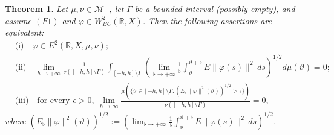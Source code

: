 \documentclass[11pt]{amsart}
\newtheorem{theorem}{Theorem}[section]
\begin{document}
\begin{theorem}\label{E2char}
Let $\mu,\nu\in\mathcal M^+$, let $\Gamma$ be a bounded interval (possibly empty), and assume $(F1)$ and $\varphi\in W^2_{BC}(\mathbb R,X)$. Then the following assertions are equivalent:
\begin{align*}
&\text{(i)}\quad \varphi\in E^2(\mathbb R,X,\mu,\nu);\\
&\text{(ii)}\quad \lim_{h\to+\infty}\frac1{\nu([-h,h]\setminus\Gamma)}\int_{[-h,h]\setminus\Gamma}\left(\lim_{\flat\to+\infty}\frac1\flat\int_\vartheta^{\vartheta+\flat}E\|\varphi(s)\|^2\,ds\right)^{1/2}d\mu(\vartheta)=0;\\
&\text{(iii)}\quad \text{for every }\epsilon>0,\ \lim_{h\to\infty}\frac{\mu(\{\vartheta\in[-h,h]\setminus\Gamma:(E_\flat\|\varphi\|^2(\vartheta))^{1/2}>\epsilon\})}{\nu([-h,h]\setminus\Gamma)}=0,
\end{align*}
where $(E_\flat\|\varphi\|^2(\vartheta))^{1/2}:=\left(\lim_{\flat\to+\infty}\frac1\flat\int_\vartheta^{\vartheta+\flat}E\|\varphi(s)\|^2\,ds\right)^{1/2}$.
\end{theorem}
\end{document}
